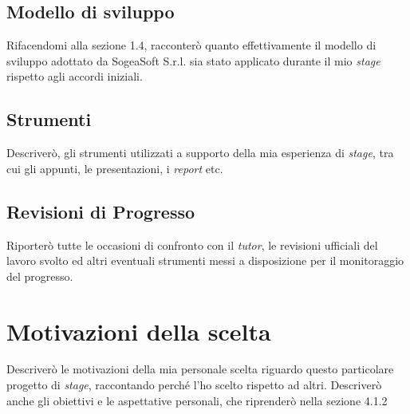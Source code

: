         \subsection{Modello di sviluppo}
        Rifacendomi alla sezione 1.4, racconterò quanto effettivamente il modello di sviluppo adottato da SogeaSoft S.r.l. sia stato applicato durante il mio \textit{stage} rispetto agli accordi iniziali. 
        \subsection{Strumenti}
        Descriverò, gli strumenti utilizzati a supporto della mia esperienza di \textit{stage}, tra cui gli appunti, le presentazioni, i \textit{report} etc. 
        \subsection{Revisioni di Progresso}
        Riporterò tutte le occasioni di confronto con il \textit{tutor}, le revisioni ufficiali del lavoro svolto ed altri eventuali strumenti messi a disposizione per il monitoraggio del progresso. 
    \section{Motivazioni della scelta}
    Descriverò le motivazioni della mia personale scelta riguardo questo particolare progetto di \textit{stage}, raccontando perché l'ho scelto rispetto ad altri. Descriverò anche gli obiettivi e le aspettative personali, che riprenderò nella sezione 4.1.2
    
        